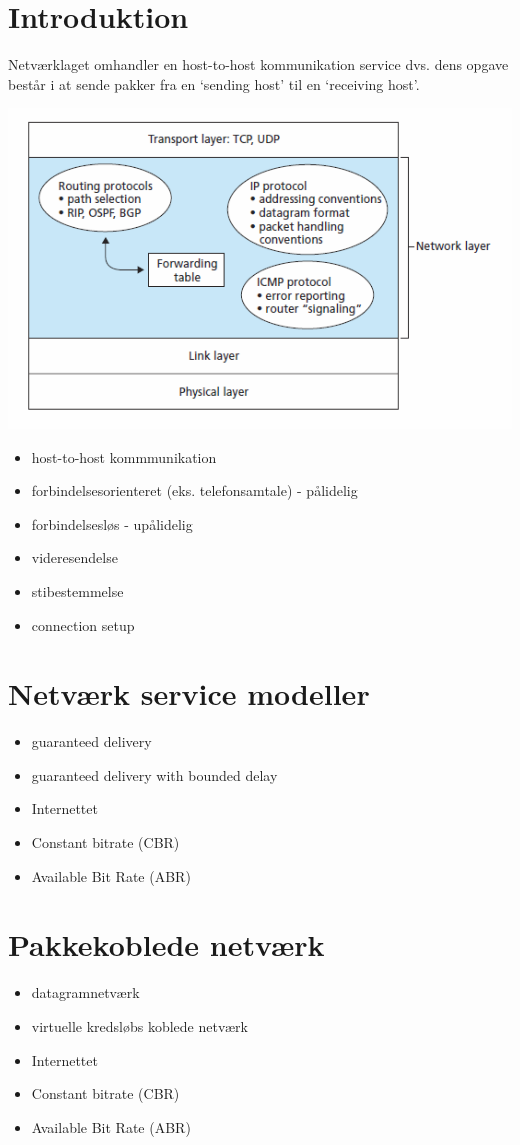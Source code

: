 \section{Introduktion}
Netværklaget omhandler en host-to-host kommunikation service dvs. dens opgave består i at sende pakker fra en ‘sending host’ til en ‘receiving host’.
\begin{center}
  \includegraphics{4-network-layer/networklayer.png}
\end{center}
\begin{itemize}
	\item host-to-host kommmunikation
	\item forbindelsesorienteret (eks. telefonsamtale) - pålidelig
	\item forbindelsesløs - upålidelig
	\item videresendelse
	\item stibestemmelse
	\item connection setup
\end{itemize}

\section{Netværk service modeller}
\begin{itemize}
	\item guaranteed delivery
	\item guaranteed delivery with bounded delay
	\item Internettet
	\item Constant bitrate (CBR)
	\item Available Bit Rate (ABR)
\end{itemize}

\section{Pakkekoblede netværk}
\begin{itemize}
	\item datagramnetværk 
	\item virtuelle kredsløbs koblede netværk
	\item Internettet
	\item Constant bitrate (CBR)
	\item Available Bit Rate (ABR)
\end{itemize}

